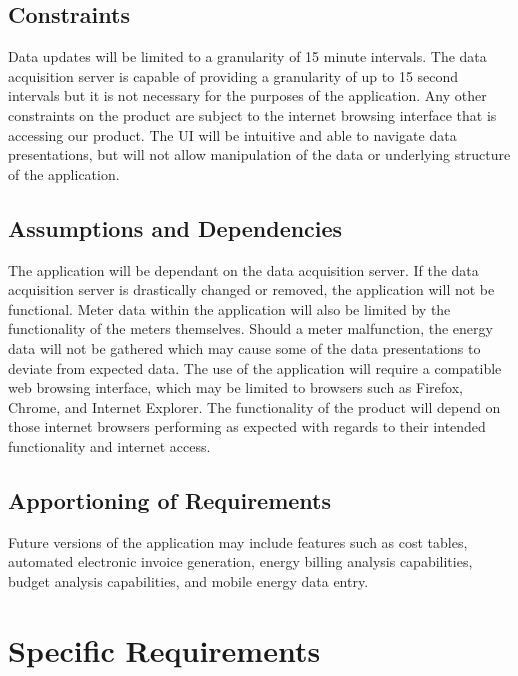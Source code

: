 \documentclass[onecolumn, draftclsnofoot,10pt, compsoc]{IEEEtran}
\begin{document}
    \subsection{Constraints}
    Data updates will be limited to a granularity of 15 minute intervals. The data acquisition server is capable of providing a granularity of up to 15 second intervals but it is not necessary for the purposes of the application. Any other constraints on the product are subject to the internet browsing interface that is accessing our product. The UI will be intuitive and able to navigate data presentations, but will not allow manipulation of the data or underlying structure of the application.
    
    \subsection{Assumptions and Dependencies}
    The application will be dependant on the data acquisition server. If the data acquisition server is drastically changed or removed, the application will not be functional. Meter data within the application will also be limited by the functionality of the meters themselves. Should a meter malfunction, the energy data will not be gathered which may cause some of the data presentations to deviate from expected data. The use of the application will require a compatible web browsing interface, which may be limited to browsers such as Firefox, Chrome, and Internet Explorer. The functionality of the product will depend on those internet browsers performing as expected with regards to their intended functionality and internet access. 

    \subsection{Apportioning of Requirements}
    Future versions of the application may include features such as cost tables, automated electronic invoice generation, energy billing analysis capabilities, budget analysis capabilities, and mobile energy data entry.
    
    \section{Specific Requirements}
    
\end{document}
